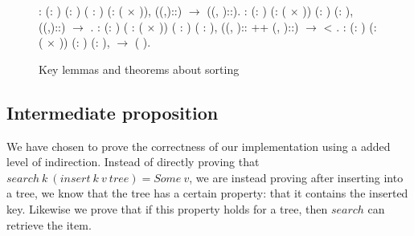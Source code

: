 \begin{figure}
  \begin{coqdoccode}
  \coqdocnoindent
    : \coqdockw{\ensuremath{\forall}} (: ) (: ) ( : ) (:  ( \ensuremath{\times} )),\coqdoceol
  \coqdocindent{1.00em}
   ((,)::) \ensuremath{\rightarrow} ((, )::).\coqdoceol
  \coqdocemptyline
  \coqdocnoindent
    : \coqdockw{\ensuremath{\forall}} (: ) (:  ( \ensuremath{\times} )) (: ) (: ),\coqdoceol
  \coqdocindent{1.00em}
   ((,)::) \ensuremath{\rightarrow}  .\coqdoceol
  \coqdocemptyline
  \coqdocnoindent
    : \coqdockw{\ensuremath{\forall}} (: ) ( :  ( \ensuremath{\times} )) ( : ) ( : ),\coqdoceol
  \coqdocindent{1.00em}
  ((, ):: ++ (, )::) \ensuremath{\rightarrow}  < .\coqdoceol
  \coqdocemptyline
  \coqdocnoindent
    : \coqdockw{\ensuremath{\forall}} (: ) (:  ( \ensuremath{\times} )) (: ) (: ),\coqdoceol
  \coqdocindent{1.00em}
    \ensuremath{\rightarrow}  (   ).\coqdoceol
  \coqdocemptyline
  \end{coqdoccode}
  \caption{Key lemmas and theorems about sorting}
  \label{fig:key_sorting_lemmas}
\end{figure}

\subsection{Intermediate proposition}
We have chosen to prove the correctness of our implementation using a added level of indirection. Instead of directly proving that $search~k~(insert~k~v~ tree) = Some~v$, we are instead proving after inserting into a tree, we know that the tree has a certain property: that it contains the inserted key. Likewise we prove that if this property holds for a tree, then $search$ can retrieve the item.

